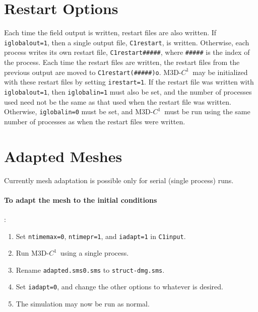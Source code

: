 \documentclass[letterpaper]{book}
\newcommand{\codename}{\textsc{M3D-$C^1$}}
\begin{document}
\section{Restart Options}

Each time the field output is written, restart files are also written.
If \texttt{iglobalout=1}, then a single output file,
\texttt{C1restart}, is written.  Otherwise, each process writes its
own restart file, \texttt{C1restart\#\#\#\#\#}, where
\texttt{\#\#\#\#\#} is the index of the process.  Each time the
restart files are written, the restart files from the previous output
are moved to \texttt{C1restart(\#\#\#\#\#)o}.  \codename\ may be
initialized with these restart files by setting \texttt{irestart=1}.
If the restart file was written with \texttt{iglobalout=1}, then
\texttt{iglobalin=1} must also be set, and the number of processes
used need not be the same as that used when the restart file was
written.  Otherwise, \texttt{iglobalin=0} must be set, and
\codename\ must be run using the same number of processes as when the
restart files were written.


\section{Adapted Meshes}

Currently mesh adaptation is possible only for serial (single process)
runs.  

\paragraph{To adapt the mesh to the initial conditions}:
\begin{enumerate}
\item Set \texttt{ntimemax=0}, \texttt{ntimepr=1}, and
  \texttt{iadapt=1} in \texttt{C1input}.
\item Run \codename\ using a single process.  
\item Rename \texttt{adapted.sms0.sms} to \texttt{struct-dmg.sms}.
\item Set \texttt{iadapt=0}, and change the other options to whatever
  is desired.  
\item The simulation may now be run as normal.
\end{enumerate}
\end{document}

